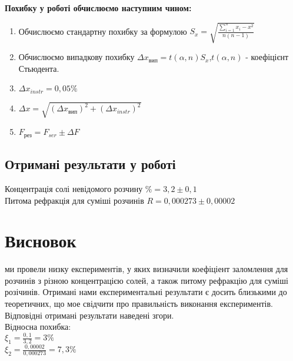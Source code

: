 
\begin{center}
  \textbf{Похибку у роботі обчислюємо наступним чином:}
\end{center}
\begin{enumerate}
  \item Обчислюємо стандартну похибку за формулою $S_x = \sqrt{\frac{\sum\limits_{i=1}^n{x_i - x}^2}{n(n-1)}}$
  \item Обчислюємо випадкову похибку $\Delta x_{вип} = t(\alpha , n) S_x$,$t(\alpha, n )$ - коефіцієнт Стьюдента.
  \item $\Delta x_{instr} = 0,05\%$
  \item {$\Delta x = \sqrt{(\Delta x_{вип})^2 + (\Delta x_{instr})^2}$}
  \item $F_{рез} = F_{ser} \pm \Delta F$
\end{enumerate}
\subsection{Отримані результати у роботі}
Концентрація солі невідомого розчину $\% = 3,2 \pm 0,1$ \\
Питома рефракція для суміші розчинів $R = 0,000273 \pm 0,00002$\\
\section{Висновок}
\setlength{\parindent}{4em}
\qquad ми провели низку експериментів, у яких визначили коефіціент заломлення для розчинів з різною концентрацією солей, а також питому рефракцію для суміші розічинів. Отримані нами експериментальні результати є досить близькими до теоретичних, що мое свідчити про правильність виконання експериментів. Відповідні отримані результати наведені згори.\\
Відносна похибка:\\ $\xi_1 =\frac{0,1}{3,2} = 3\%$ \\
$\xi_2 =\frac{0,00002}{0,000273} = 7,3\%$
